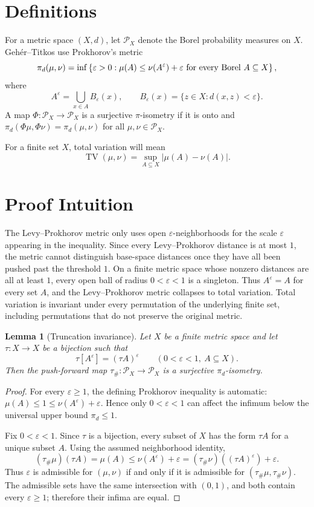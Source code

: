 \documentclass[11pt]{article}
\newtheorem{lemma}{Lemma}
\newcommand{\PX}{\mathcal P_X}
\newcommand{\TV}{\operatorname{TV}}
\begin{document}
\section*{Definitions}

For a metric space \((X,d)\), let \(\PX\) denote the Borel probability
measures on \(X\).  Geh\'er--Titkos use Prokhorov's metric
\[
  \pi_d(\mu,\nu)=
  \inf\left\{\varepsilon>0:
  \mu(A)\le \nu(A^\varepsilon)+\varepsilon
  \ \hbox{for every Borel }A\subseteq X\right\},
\]
where
\[
  A^\varepsilon=\bigcup_{x\in A}B_\varepsilon(x),\qquad
  B_\varepsilon(x)=\{z\in X:d(x,z)<\varepsilon\}.
\]
A map \(\Phi:\PX\to\PX\) is a surjective \(\pi\)-isometry if it is onto and
\(\pi_d(\Phi\mu,\Phi\nu)=\pi_d(\mu,\nu)\) for all \(\mu,\nu\in\PX\).

For a finite set \(X\), total variation will mean
\[
  \TV(\mu,\nu)=\sup_{A\subseteq X}|\mu(A)-\nu(A)|.
\]

\section*{Proof Intuition}

The Levy--Prokhorov metric only uses open \(\varepsilon\)-neighborhoods for
the scale \(\varepsilon\) appearing in the inequality.  Since every
Levy--Prokhorov distance is at most \(1\), the metric cannot distinguish
base-space distances once they have all been pushed past the threshold \(1\).
On a finite metric space whose nonzero distances are all at least \(1\), every
open ball of radius \(0<\varepsilon<1\) is a singleton.  Thus \(A^\varepsilon=A\)
for every set \(A\), and the Levy--Prokhorov metric collapses to total
variation.  Total variation is invariant under every permutation of the
underlying finite set, including permutations that do not preserve the original
metric.

\begin{lemma}[Truncation invariance]\label{lem:trunc}
Let \(X\) be a finite metric space and let \(\tau:X\to X\) be a bijection such
that
\[
  \tau[A^\varepsilon]=(\tau A)^\varepsilon
  \qquad(0<\varepsilon<1,\ A\subseteq X).
\]
Then the push-forward map \(\tau_\#:\PX\to\PX\) is a surjective
\(\pi_d\)-isometry.
\end{lemma}

\begin{proof}
For every \(\varepsilon\ge 1\), the defining Prokhorov inequality is automatic:
\(\mu(A)\le 1\le \nu(A^\varepsilon)+\varepsilon\).  Hence only
\(0<\varepsilon<1\) can affect the infimum below the universal upper bound
\(\pi_d\le 1\).

Fix \(0<\varepsilon<1\).  Since \(\tau\) is a bijection, every subset of \(X\)
has the form \(\tau A\) for a unique subset \(A\).  Using the assumed
neighborhood identity,
\[
  (\tau_\#\mu)(\tau A)
  =\mu(A)
  \le \nu(A^\varepsilon)+\varepsilon
  =(\tau_\#\nu)((\tau A)^\varepsilon)+\varepsilon .
\]
Thus \(\varepsilon\) is admissible for \((\mu,\nu)\) if and only if it is
admissible for \((\tau_\#\mu,\tau_\#\nu)\).  The admissible sets have the same
intersection with \((0,1)\), and both contain every \(\varepsilon\ge1\);
therefore their infima are equal.
\end{proof}
\end{document}
